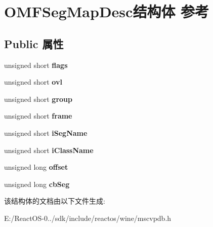 \hypertarget{struct_o_m_f_seg_map_desc}{}\section{O\+M\+F\+Seg\+Map\+Desc结构体 参考}
\label{struct_o_m_f_seg_map_desc}
\subsection*{Public 属性}
\begin{DoxyCompactItemize}
\item 
\mbox{\label{struct_o_m_f_seg_map_desc_a919f058fbaeaed7d1a9a76881092af2e}} 
unsigned short {\bfseries flags}
\item 
\mbox{\label{struct_o_m_f_seg_map_desc_a6471255da608b556d46de9af841cca09}} 
unsigned short {\bfseries ovl}
\item 
\mbox{\label{struct_o_m_f_seg_map_desc_a3c9b5c2e503a4d10f4e91a2dc76edb01}} 
unsigned short {\bfseries group}
\item 
\mbox{\label{struct_o_m_f_seg_map_desc_ac0853b806a1a85f44acd63ea14a2d494}} 
unsigned short {\bfseries frame}
\item 
\mbox{\label{struct_o_m_f_seg_map_desc_a83a59e8cf53325388b9c358a0ec91156}} 
unsigned short {\bfseries i\+Seg\+Name}
\item 
\mbox{\label{struct_o_m_f_seg_map_desc_ab74ebb6ee8fd43594b27148de492e916}} 
unsigned short {\bfseries i\+Class\+Name}
\item 
\mbox{\label{struct_o_m_f_seg_map_desc_a663268d6c5080d06452cc57c12bdfd1c}} 
unsigned long {\bfseries offset}
\item 
\mbox{\label{struct_o_m_f_seg_map_desc_a3ab8562357941ba87c9cb06a7061fa4a}} 
unsigned long {\bfseries cb\+Seg}
\end{DoxyCompactItemize}


该结构体的文档由以下文件生成\+:\begin{DoxyCompactItemize}
\item 
E\+:/\+React\+O\+S-\/0../sdk/include/reactos/wine/mscvpdb.\+h\end{DoxyCompactItemize}
